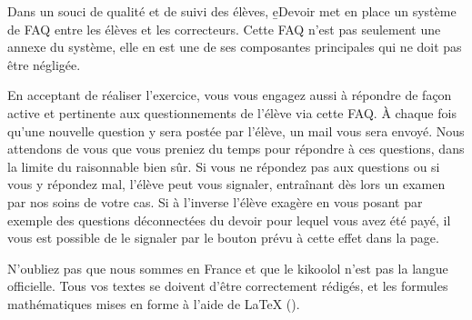 ﻿Dans un souci de qualité et de suivi des élèves, \b{eDevoir} met en place un système de FAQ entre les élèves et les correcteurs. Cette FAQ n'est pas seulement une annexe du système, elle en est une de ses composantes principales qui ne doit pas être négligée.

En acceptant de réaliser l'exercice, vous vous engagez aussi à répondre de façon active et pertinente aux questionnements de l'élève via cette FAQ. À chaque fois qu'une nouvelle question y sera postée par l'élève, un mail vous sera envoyé. Nous attendons de vous que vous preniez du temps pour répondre à ces questions, dans la limite du raisonnable bien sûr.
Si vous ne répondez pas aux questions ou si vous y répondez mal, l'élève peut vous signaler, entraînant dès lors un examen par nos soins de votre cas. Si à l'inverse l'élève exagère en vous posant par exemple des questions déconnectées du devoir pour lequel vous avez été payé, il vous est possible de le signaler par le bouton prévu à cette effet dans la page.

N'oubliez pas que nous sommes en France et que le kikoolol n'est pas la langue officielle. Tous vos textes se doivent d'être correctement rédigés, et les formules mathématiques mises en forme à l'aide de LaTeX ().